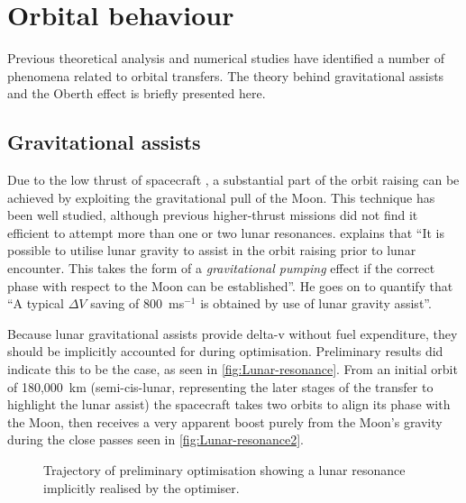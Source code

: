 


\section{Orbital behaviour}

Previous theoretical analysis and numerical studies have identified a number of phenomena related to orbital transfers. The theory behind gravitational assists and the Oberth effect is briefly presented here.

\subsection{Gravitational assists} \label{sub:Grav-assist}

Due to the low thrust of spacecraft \BW, a substantial part of the orbit raising can be achieved by exploiting the gravitational pull of the Moon. This technique has been well studied, although previous higher-thrust missions did not find it efficient to attempt more than one or two lunar resonances. \textcite{Kemble2006} explains that \enquote{It is possible to utilise lunar gravity to assist in the orbit raising prior to lunar encounter. This takes the form of a \emph{gravitational pumping} effect if the correct phase with respect to the Moon can be established}. He goes on to quantify that \enquote{A typical $\Delta V$ saving of 800~ms$^{-1}$ is obtained by use of lunar gravity assist}. 

Because lunar gravitational assists provide delta-v without fuel expenditure, they should be implicitly accounted for during optimisation. Preliminary results did indicate this to be the case, as seen in \autoref{fig:Lunar-resonance}. From an initial orbit of 180,000~km (semi-cis-lunar, representing the later stages of the transfer to highlight the lunar assist) the spacecraft takes two orbits to align its phase with the Moon, then receives a very apparent boost purely from the Moon's gravity during the close passes seen in \autoref{fig:Lunar-resonance2}.

\begin{figure}
\caption{Trajectory of preliminary optimisation showing a lunar resonance implicitly realised by the optimiser.} \label{fig:Lunar-resonance}
\centering
\def\svgwidth{\figurewidth}

\end{figure}

